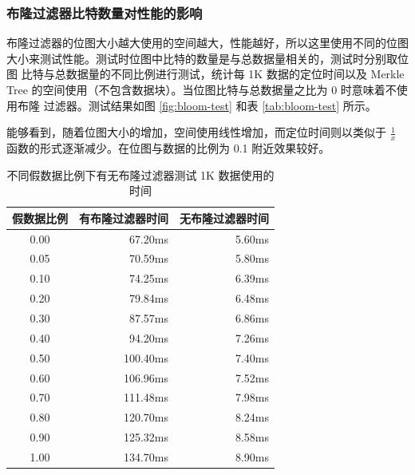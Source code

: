 \documentclass{mydoc}
\begin{document}
\subsubsection{布隆过滤器比特数量对性能的影响}

布隆过滤器的位图大小越大使用的空间越大，性能越好，所以这里使用不同的位图
大小来测试性能。测试时位图中比特的数量是与总数据量相关的，测试时分别取位图
比特与总数据量的不同比例进行测试，统计每 1K 数据的定位时间以及 Merkle Tree
的空间使用（不包含数据块）。当位图比特与总数据量之比为 0 时意味着不使用布隆
过滤器。测试结果如图 \ref{fig:bloom-test} 和表 \ref{tab:bloom-test} 所示。

能够看到，随着位图大小的增加，空间使用线性增加，而定位时间则以类似于 $\frac{1}{x}$
函数的形式逐渐减少。在位图与数据的比例为 0.1 附近效果较好。

\begin{table}[htbp]
  \centering
  \caption{不同假数据比例下有无布隆过滤器测试 1K 数据使用的时间}%
  \label{tab:false-percent}

  \vspace{10pt}
  \begin{tabular}{crr}
    \toprule
    \textbf{假数据比例} & \textbf{有布隆过滤器时间} & \textbf{无布隆过滤器时间} \\
    \midrule
    0.00 & 67.20ms  & 5.60ms \\
    0.05 & 70.59ms  & 5.80ms \\
    0.10 & 74.25ms  & 6.39ms \\
    0.20 & 79.84ms  & 6.48ms \\
    0.30 & 87.57ms  & 6.86ms \\
    0.40 & 94.20ms  & 7.26ms \\
    0.50 & 100.40ms & 7.40ms \\
    0.60 & 106.96ms & 7.52ms \\
    0.70 & 111.48ms & 7.98ms \\
    0.80 & 120.70ms & 8.24ms \\
    0.90 & 125.32ms & 8.58ms \\
    1.00 & 134.70ms & 8.90ms \\
    \bottomrule
  \end{tabular}
\end{table}
\end{document}

